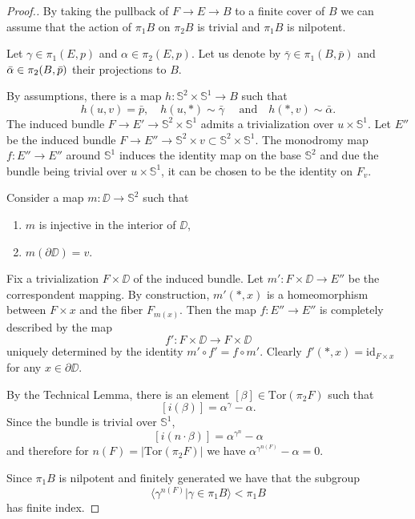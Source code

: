 \documentclass{amsart}
\begin{document}
\begin{proof}[Proof.] 
By taking the pullback of $F\to E\to B$ to a finite cover of $B$ we can assume that  the action of $\pi_1B$ on $\pi_2B$ is trivial and $\pi_1B$ is nilpotent.

Let $\gamma\in \pi_1(E,p)$ and $\alpha\in \pi_2(E,p)$. 
Let us denote by $\bar\gamma\in \pi_1(B,\bar p)$ and 
$\bar\alpha\z\in \pi_2(B,\bar p)$ their projections to $B$.

By assumptions, there is a map
$h\colon \mathbb{S}^2\times \mathbb{S}^1\to B$ such that 
$$h(u,v)=\bar p,\quad
h(u,*)\sim\bar\gamma\quad\text{ and}\quad
h(*,v)\sim\bar\alpha.$$
The induced bundle $F\to E'\to \mathbb{S}^2\times \mathbb{S}^1$ admits a 
trivialization over $u\times \mathbb{S}^1$.
Let $E''$ be the  induced bundle $F\to E''\to \mathbb{S}^2\times v\subset \mathbb{S}^2\times \mathbb{S}^1$.
The  monodromy map $f\colon E''\to E''$ around $\mathbb{S}^1$
induces the  identity map on the base $\mathbb{S}^2$ 
and due the bundle being trivial  over $u\times \mathbb{S}^1$,
it  can be chosen to be the identity on $F_v$.

Consider a map $m\colon \DD\to \mathbb{S}^2$ such that 
\begin{enumerate}[(1)]
\item  $m$ is injective in the interior of $\DD$, 
\item  $m(\partial \DD)=v$.
\end{enumerate}
Fix a trivialization 
$F\times \DD$ of the induced bundle. 
Let 
$m'\colon F\times \DD\to E''$ be the correspondent mapping. 
By construction, $m'(*,x)$ is a homeomorphism  between $F\times x$ and the fiber $F_{m(x)}$.
Then the map $f\colon E''\to E''$ is completely described by the map 
$$f'\colon F\times \DD\to F\times \DD $$ 
uniquely determined  by the  identity
$m'\circ f'=f\circ m'$. 
Clearly $f'(*,x)=\mathrm{id}_{F\times x}$ 
for any $x\in\partial \DD$.

By the Technical Lemma, there is an element 
$[\beta]\in \mathrm{Tor}(\pi_2F)$ such that 
\[[i(\beta)]=\alpha^\gamma-\alpha.\]
Since the bundle is trivial over $\mathbb{S}^1$,
\[[i(n{\cdot} \beta)]=\alpha^{\gamma^n}-\alpha\] and therefore for $n(F)=|\mathrm{Tor}(\pi_2F)|$ we have 
$\alpha^{\gamma^{n(F)}}-\alpha=0$. 

Since $\pi_1B$ is nilpotent and finitely generated we have that the subgroup  \[\langle\gamma^{n(F)}|\gamma\in \pi_1B\rangle<\pi_1B\] 
has finite index.
\end{proof}
\end{document}
